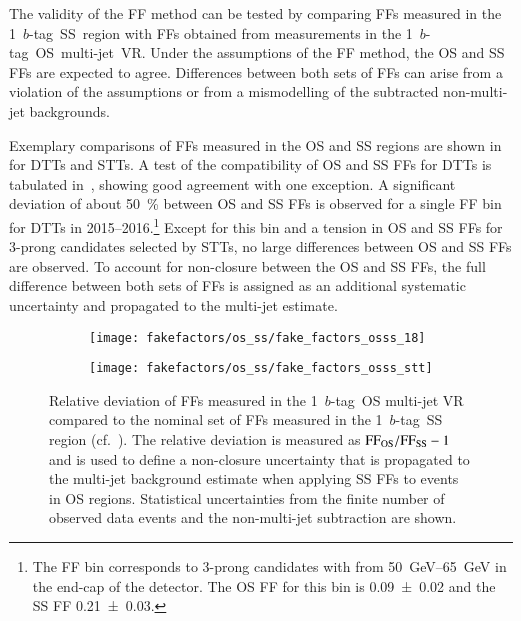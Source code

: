 The validity of the FF method can be tested by comparing FFs measured in the
1~$b$-tag~SS~region with FFs obtained from measurements in the
1~$b$-tag~OS~multi-jet~VR. Under the assumptions of the FF method, the OS and SS
FFs are expected to agree. Differences between both sets of FFs can arise from a
violation of the assumptions or from a mismodelling of the subtracted
non-multi-jet backgrounds.

Exemplary comparisons of FFs measured in the OS and SS regions are shown
in~ for DTTs and STTs. A test of the compatibility of
OS and SS FFs for DTTs is tabulated in~,
showing good agreement with one exception. A significant deviation of about
\SI{50}{\percent} between OS and SS FFs is observed for a single FF bin for DTTs
in 2015--2016.\footnote{The FF bin corresponds to 3-prong \tauhadvis candidates
  with \pT from \SIrange{50}{65}{\GeV} in the end-cap of the detector. The OS FF
  for this bin is \num{0.09 +- 0.02} and the SS FF \num{0.21 +- 0.03}.} Except
for this bin and a tension in OS and SS FFs for 3-prong \tauhadvis candidates
selected by STTs, no large differences between OS and SS FFs are observed.
To account for non-closure between the OS and SS FFs, the full difference
between both sets of FFs is assigned as an additional systematic uncertainty and
propagated to the multi-jet estimate.

\begin{figure}[htbp]
  \centering

  \begin{subfigure}[t]{0.48\textwidth}
    \texttt{[image: fakefactors/os\_ss/fake\_factors\_osss\_18]}
    \label{fig:fake_factor_OSSS_dtt}
  \end{subfigure}\hfill%
  \begin{subfigure}[t]{0.48\textwidth}
    \texttt{[image: fakefactors/os\_ss/fake\_factors\_osss\_stt]}
    \label{fig:fake_factor_OSSS_stt}
  \end{subfigure}

  \caption{Relative deviation of FFs measured in the 1~$b$-tag~OS multi-jet VR
    compared to the nominal set of FFs measured in the 1~$b$-tag~SS region
    (cf.~). The relative
    deviation is measured as $\text{FF}_\text{OS} / \text{FF}_\text{SS} - 1$ and is used to
    define a non-closure uncertainty that is propagated to the multi-jet
    background estimate when applying SS FFs to events in OS
    regions. Statistical uncertainties from the finite number of observed data
    events and the non-multi-jet subtraction are shown.}%
  \label{fig:fake_factor_OSSS}
\end{figure}

